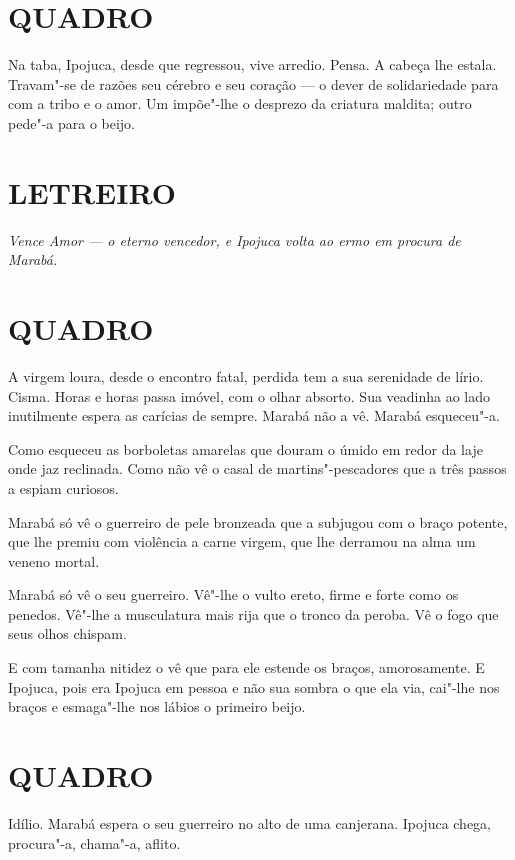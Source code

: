 \section*{QUADRO}

Na taba, Ipojuca, desde que regressou, vive arredio. Pensa. A cabeça lhe
estala. Travam"-se de razões seu cérebro e seu coração --- o dever de
solidariedade para com a tribo e o amor. Um impõe"-lhe o desprezo da
criatura maldita; outro pede"-a para o beijo.

\section*{LETREIRO}

\emph{Vence Amor --- o eterno vencedor, e Ipojuca volta ao ermo em
procura de Marabá.}

\section*{QUADRO}

A virgem loura, desde o encontro fatal, perdida tem a sua serenidade de
lírio. Cisma. Horas e horas passa imóvel, com o olhar absorto. Sua
veadinha ao lado inutilmente espera as carícias de sempre. Marabá não a
vê. Marabá esqueceu"-a.

Como esqueceu as borboletas amarelas que douram o úmido em redor da laje
onde jaz reclinada. Como não vê o casal de martins"-pescadores que a três
passos a espiam curiosos.

Marabá só vê o guerreiro de pele bronzeada que a subjugou com o braço
potente, que lhe premiu com violência a carne virgem, que lhe derramou
na alma um veneno mortal.

Marabá só vê o seu guerreiro. Vê"-lhe o vulto ereto, firme e forte como
os penedos. Vê"-lhe a musculatura mais rija que o tronco da peroba. Vê o
fogo que seus olhos chispam.

E com tamanha nitidez o vê que para ele estende os braços, amorosamente.
E Ipojuca, pois era Ipojuca em pessoa e não sua sombra o que ela via,
cai"-lhe nos braços e esmaga"-lhe nos lábios o primeiro beijo.

\section*{QUADRO}

Idílio. Marabá espera o seu guerreiro no alto de uma canjerana. Ipojuca
chega, procura"-a, chama"-a, aflito.

